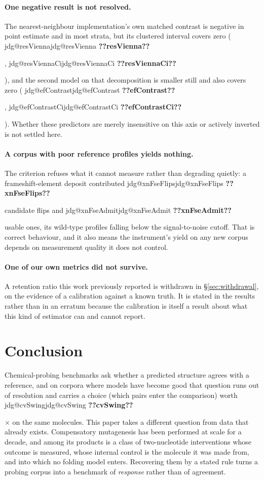 \documentclass[11pt]{article}
\makeatletter
\newcommand{\jdg}[1]{%
  \ifcsname jdg@#1\endcsname\csname jdg@#1\endcsname
  \else\textbf{??#1??}\PackageError{nm}{undefined measured quantity #1}{}\fi}
\makeatother
\begin{document}
\paragraph{One negative result is not resolved.} The nearest-neighbour implementation's own
matched contrast is negative in point estimate and in most strata, but its clustered interval
covers zero (\jdg{resVienna}, \jdg{resViennaCi}), and the second model on that decomposition is
smaller still and also covers zero (\jdg{efContrast}, \jdg{efContrastCi}). Whether these
predictors are merely insensitive on this axis or actively inverted is not settled here.

\paragraph{A corpus with poor reference profiles yields nothing.} The criterion refuses what it
cannot measure rather than degrading quietly: a frameshift-element deposit contributed
\jdg{xnFseFlips} candidate flips and \jdg{xnFseAdmit} usable ones, its wild-type profiles falling
below the signal-to-noise cutoff. That is correct behaviour, and it also means the instrument's
yield on any new corpus depends on measurement quality it does not control.

\paragraph{One of our own metrics did not survive.} A retention ratio this work previously
reported is withdrawn in \S\ref{sec:withdrawal}, on the evidence of a calibration against a known
truth. It is stated in the results rather than in an erratum because the calibration is itself a
result about what this kind of estimator can and cannot report.


\section{Conclusion}
\label{sec:conclusion}

Chemical-probing benchmarks ask whether a predicted structure agrees with a reference, and on
corpora where models have become good that question runs out of resolution and carries a choice
(which pairs enter the comparison) worth \jdg{cvSwing}$\times$ on the same molecules. This
paper takes a different question from data that already exists. Compensatory mutagenesis has been
performed at scale for a decade, and among its products is a class of two-nucleotide interventions
whose outcome is measured, whose internal control is the molecule it was made from, and into which
no folding model enters. Recovering them by a stated rule turns a probing corpus into a benchmark
of \emph{response} rather than of agreement.
\end{document}

